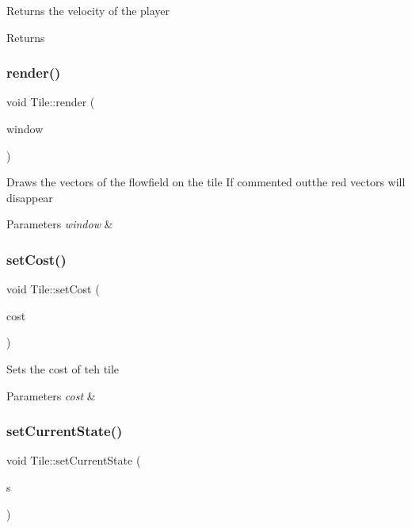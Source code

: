 Returns the velocity of the player 

\begin{DoxyReturn}{Returns}

\end{DoxyReturn}
\mbox{\label{class_tile_a57444de210a362d359197d5a6b5e16e9}} 
\subsubsection{\texorpdfstring{render()}{render()}}
{\footnotesize\ttfamily void Tile\+::render (\begin{DoxyParamCaption}\item[{sf\+::\+Render\+Window \&}]{window }\end{DoxyParamCaption})}



Draws the vectors of the flowfield on the tile If commented outthe red vectors will disappear 


\begin{DoxyParams}{Parameters}
{\em window} & \\
\hline
\end{DoxyParams}
\mbox{\label{class_tile_a25e810638e63d695b3525bc7349e50ef}} 
\subsubsection{\texorpdfstring{setCost()}{setCost()}}
{\footnotesize\ttfamily void Tile\+::set\+Cost (\begin{DoxyParamCaption}\item[{int}]{cost }\end{DoxyParamCaption})}



Sets the cost of teh tile 


\begin{DoxyParams}{Parameters}
{\em cost} & \\
\hline
\end{DoxyParams}
\mbox{\label{class_tile_aa5028a9f698e54f7c0263a255ec99732}} 
\subsubsection{\texorpdfstring{setCurrentState()}{setCurrentState()}}
{\footnotesize\ttfamily void Tile\+::set\+Current\+State (\begin{DoxyParamCaption}\item[{State}]{s }\end{DoxyParamCaption})}



